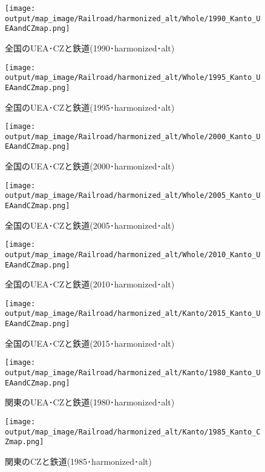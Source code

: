 \documentclass{ltjsarticle}
\begin{document}
\begin{figure}[pbth]
  \centering
  \texttt{[image: output/map\_image/Railroad/harmonized\_alt/Whole/1990\_Kanto\_UEAandCZmap.png]}
  \caption{\label{altham:1990:allCZandUEA:Rail}全国のUEA･CZと鉄道(1990･harmonized･alt)}
\end{figure}


\begin{figure}[pbth]
  \centering
  \texttt{[image: output/map\_image/Railroad/harmonized\_alt/Whole/1995\_Kanto\_UEAandCZmap.png]}
  \caption{\label{altham:1995:allCZandUEA:Rail}全国のUEA･CZと鉄道(1995･harmonized･alt)}
\end{figure}


\begin{figure}[pbth]
  \centering
  \texttt{[image: output/map\_image/Railroad/harmonized\_alt/Whole/2000\_Kanto\_UEAandCZmap.png]}
  \caption{\label{altham:2000:allCZandUEA:Rail}全国のUEA･CZと鉄道(2000･harmonized･alt)}
\end{figure}


\begin{figure}[pbth]
  \centering
  \texttt{[image: output/map\_image/Railroad/harmonized\_alt/Whole/2005\_Kanto\_UEAandCZmap.png]}
  \caption{\label{altham:2005:allCZandUEA:Rail}全国のUEA･CZと鉄道(2005･harmonized･alt)}
\end{figure}


\begin{figure}[pbth]
  \centering
  \texttt{[image: output/map\_image/Railroad/harmonized\_alt/Whole/2010\_Kanto\_UEAandCZmap.png]}
  \caption{\label{altham:2010:allCZandUEA:Rail}全国のUEA･CZと鉄道(2010･harmonized･alt)}
\end{figure}


\begin{figure}[pbth]
  \centering
  \texttt{[image: output/map\_image/Railroad/harmonized\_alt/Kanto/2015\_Kanto\_UEAandCZmap.png]}
  \caption{\label{altham:2015:allCZandUEA:Rail}全国のUEA･CZと鉄道(2015･harmonized･alt)}
\end{figure}

\begin{figure}[pbth]
  \centering
  \texttt{[image: output/map\_image/Railroad/harmonized\_alt/Kanto/1980\_Kanto\_UEAandCZmap.png]}
  \caption{\label{altham:1980:KanCZandUEA:Rail}関東のUEA･CZと鉄道(1980･harmonized･alt)}
\end{figure}


\begin{figure}[pbth]
  \centering
  \texttt{[image: output/map\_image/Railroad/harmonized\_alt/Kanto/1985\_Kanto\_CZmap.png]}
  \caption{\label{altham:1985:KanCZandUEA:Rail}関東のCZと鉄道(1985･harmonized･alt)}
\end{figure}
\end{document}
